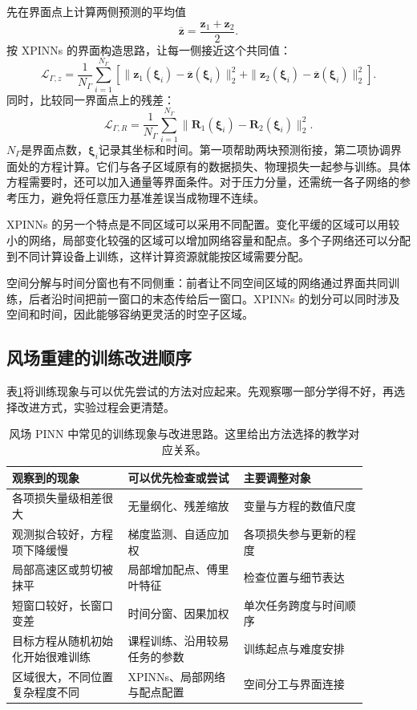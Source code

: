 先在界面点上计算两侧预测的平均值
\[
 \overline{\mathbf z}=\frac{\mathbf z_1+\mathbf z_2}{2}.
\]
按 XPINNs 的界面构造思路，让每一侧接近这个共同值：
\begin{equation}
 \mathcal L_{\Gamma,z}=\frac1{N_\Gamma}\sum_{i=1}^{N_\Gamma}
 \left[
 \|\mathbf z_1(\boldsymbol\xi_i)-\overline{\mathbf z}(\boldsymbol\xi_i)\|_2^2
 +\|\mathbf z_2(\boldsymbol\xi_i)-\overline{\mathbf z}(\boldsymbol\xi_i)\|_2^2
 \right].
 \label{eq:pinn-xpinn-interface-value}
\end{equation}
同时，比较同一界面点上的残差：
\begin{equation}
 \mathcal L_{\Gamma,R}=\frac1{N_\Gamma}\sum_{i=1}^{N_\Gamma}
 \|\mathbf R_1(\boldsymbol\xi_i)-\mathbf R_2(\boldsymbol\xi_i)\|_2^2.
 \label{eq:pinn-xpinn-interface-residual}
\end{equation}
$N_\Gamma$是界面点数，$\boldsymbol\xi_i$记录其坐标和时间。第一项帮助两块预测衔接，第二项协调界面处的方程计算。它们与各子区域原有的数据损失、物理损失一起参与训练。具体方程需要时，还可以加入通量等界面条件。对于压力分量，还需统一各子网络的参考压力，避免将任意压力基准差误当成物理不连续\cite{jagtap2020xpinn}。

XPINNs 的另一个特点是不同区域可以采用不同配置。变化平缓的区域可以用较小的网络，局部变化较强的区域可以增加网络容量和配点。多个子网络还可以分配到不同计算设备上训练，这样计算资源就能按区域需要分配。

空间分解与时间分窗也有不同侧重：前者让不同空间区域的网络通过界面共同训练，后者沿时间把前一窗口的末态传给后一窗口。XPINNs 的划分可以同时涉及空间和时间，因此能够容纳更灵活的时空子区域。

\subsection{风场重建的训练改进顺序}
表\ref{tab:pinn-optimization-guide}将训练现象与可以优先尝试的方法对应起来。先观察哪一部分学得不好，再选择改进方式，实验过程会更清楚。

\begin{table}[htbp]
\centering\small
\caption{风场 PINN 中常见的训练现象与改进思路。这里给出方法选择的教学对应关系。}
\label{tab:pinn-optimization-guide}
\begin{tabular}{m{0.29\linewidth}m{0.29\linewidth}m{0.30\linewidth}}
\toprule
观察到的现象 & 可以优先检查或尝试 & 主要调整对象\\
\midrule
各项损失量级相差很大 & 无量纲化、残差缩放 & 变量与方程的数值尺度\\
观测拟合较好，方程项下降缓慢 & 梯度监测、自适应加权 & 各项损失参与更新的程度\\
局部高速区或剪切被抹平 & 局部增加配点、傅里叶特征 & 检查位置与细节表达\\
短窗口较好，长窗口变差 & 时间分窗、因果加权 & 单次任务跨度与时间顺序\\
目标方程从随机初始化开始很难训练 & 课程训练、沿用较易任务的参数 & 训练起点与难度安排\\
区域很大，不同位置复杂程度不同 & XPINNs、局部网络与配点配置 & 空间分工与界面连接\\
\bottomrule
\end{tabular}
\end{table}

